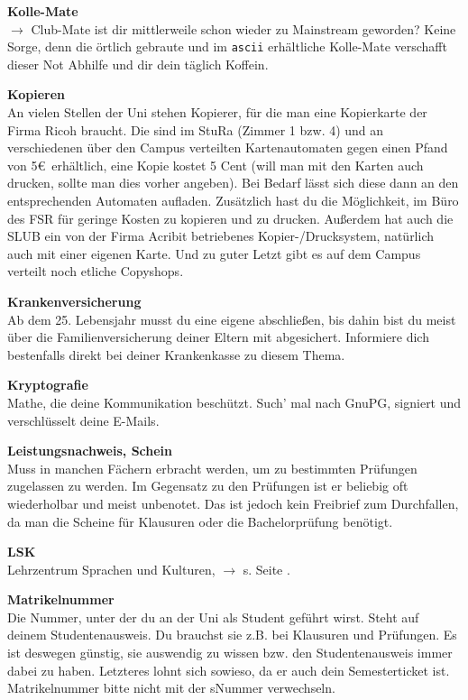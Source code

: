 \begin{multicols}{2}
\textbf{Kolle-Mate}\\
$\rightarrow$ Club-Mate ist dir mittlerweile schon wieder zu Mainstream geworden? Keine Sorge, denn die örtlich gebraute und im \texttt{ascii} erhältliche Kolle-Mate verschafft dieser Not Abhilfe und dir dein täglich Koffein.

\textbf{Kopieren} \\
An vielen Stellen der Uni stehen Kopierer, für die man eine Kopierkarte der Firma Ricoh braucht. Die sind im StuRa (Zimmer 1 bzw. 4) und an verschiedenen über den Campus verteilten Kartenautomaten gegen einen Pfand von 5\euro\ erhältlich, eine Kopie kostet 5 Cent (will man mit den Karten auch drucken, sollte man dies vorher angeben).
Bei Bedarf lässt sich diese dann an den entsprechenden Automaten aufladen.
Zusätzlich hast du die Möglichkeit, im Büro des FSR für geringe Kosten zu kopieren und zu drucken.
Außerdem hat auch die SLUB ein von der Firma Acribit betriebenes Kopier-/Drucksystem, natürlich auch mit einer eigenen Karte.
Und zu guter Letzt gibt es auf dem Campus verteilt noch etliche Copyshops.

\textbf{Krankenversicherung} \\
Ab dem 25. Lebensjahr musst du eine eigene abschließen, bis dahin bist du meist über die Familienversicherung deiner Eltern mit abgesichert.
Informiere dich bestenfalls direkt bei deiner Krankenkasse zu diesem Thema.

\textbf{Kryptografie} \\
Mathe, die deine Kommunikation beschützt.
Such' mal nach GnuPG, signiert und verschlüsselt deine E-Mails.

\textbf{Leistungsnachweis, Schein} \\
Muss in manchen Fächern erbracht werden, um zu bestimmten Prüfungen zugelassen zu werden.
Im Gegensatz zu den Prüfungen ist er beliebig oft wiederholbar und meist unbenotet.
Das ist jedoch kein Freibrief zum Durchfallen, da man die Scheine für Klausuren oder die Bachelorprüfung benötigt.

\textbf{LSK} \\
Lehrzentrum Sprachen und Kulturen, $\rightarrow$ s. Seite \pageref{sec:sprachausbildung}.

\textbf{Matrikelnummer} \\
Die Nummer, unter der du an der Uni als Student geführt wirst.
Steht auf deinem Studentenausweis.
Du brauchst sie z.B. bei Klausuren und Prüfungen.
Es ist deswegen günstig, sie auswendig zu wissen bzw. den Studentenausweis immer dabei zu haben.
Letzteres lohnt sich sowieso, da er auch dein Semesterticket ist.
Matrikelnummer bitte nicht mit der sNummer verwechseln.


\end{multicols}
